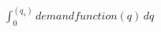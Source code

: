 \documentclass[preview]{standalone}
\begin{document}
\begin{align*}
\int_0^(q_s) demand function (q) \,dq
\end{align*}
\end{document}
